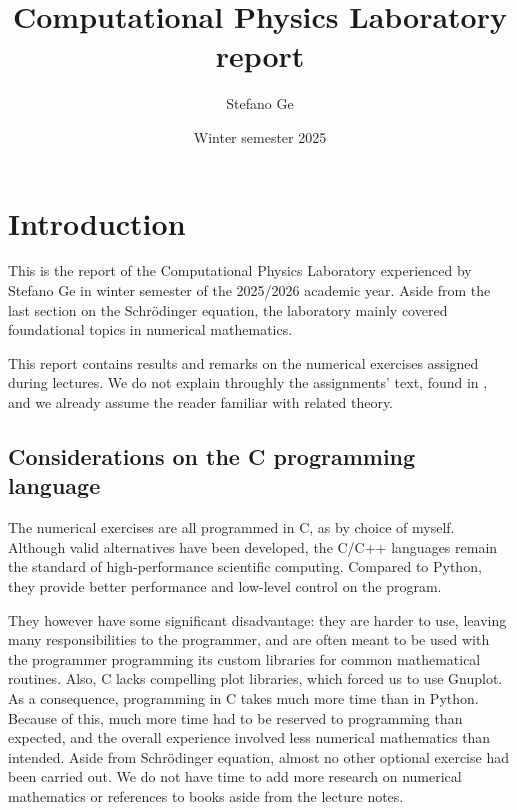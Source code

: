 \documentclass[a4paper,11]{article}
\title{Computational Physics Laboratory report}
\author{Stefano Ge}
\date{Winter semester 2025}
\begin{document}
\maketitle


\begingroup
    \hypersetup{linkcolor=black}   %
    \tableofcontents
\endgroup

\setcounter{section}{-1} %

\section{Introduction}

This is the report of the Computational Physics Laboratory experienced by
Stefano Ge in winter semester of the 2025/2026 academic year.
Aside from the last section on the Schrödinger equation, the laboratory
mainly covered foundational topics in numerical mathematics.

This report contains results and remarks on the numerical 
exercises assigned during lectures.
We do not explain throughly the assignments' text, found in \cite{brida},
and we already assume the reader familiar with related theory.

\subsection{Considerations on the C programming language}

The numerical exercises are all programmed in C, as by choice of myself.
Although valid alternatives have been developed, the C/C++ languages remain
the standard of high-performance scientific computing. Compared to Python, they
provide better performance and low-level control on the program.

They however have some significant disadvantage: they are harder to use, leaving
many responsibilities to the programmer, and are often meant to be used 
with the programmer programming its custom libraries for common mathematical 
routines. Also, C lacks compelling plot libraries, which forced us to use 
Gnuplot.
As a consequence, programming in C takes much more time than in 
Python. Because of this, much more time had to be reserved to programming 
than expected, and the overall experience involved less numerical mathematics
than intended. Aside from Schrödinger equation, almost no other optional 
exercise had been carried out. We do not have time to add more research
on numerical mathematics or references to books aside from the lecture notes. 
\end{document}
